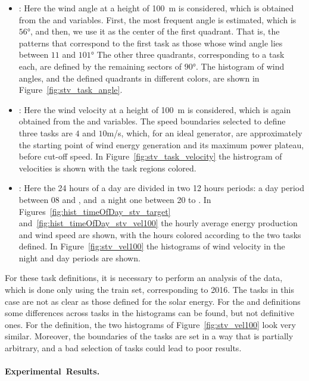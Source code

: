 \begin{itemize}
    \item {}: Here the wind angle at a height of \si{100\metre} is considered, which is obtained from the  and  variables. 
    First, the most frequent angle is estimated, which is $\ang{56}$, and then, we use it as the center of the first quadrant. That is, the patterns that correspond to the first task as those whose wind angle lies between ${11}$ and $\ang{101}$  The other three quadrants, corresponding to a task each, are defined by the remaining sectors of $\ang{90}$.
    The histogram of wind angles, and the defined quadrants in different colors, are shown in Figure~\ref{fig:stv_task_angle}.
    \item {}: Here the wind velocity at a height of \si{100\metre} is considered, which is again obtained from the  and  variables. The speed boundaries selected to define three tasks are $4$ and $10$m/s, which, for an ideal generator, are approximately the starting point of wind energy generation and its maximum power plateau, before cut-off speed.   
    In Figure~\ref{fig:stv_task_velocity} the histrogram of velocities is shown with the task regions colored. 
    \item {}: Here the 24 hours of a day are divided in two 12 hours periods: a day period between 08 and , and~a night one between 20 to .
    In Figures~\ref{fig:hist_timeOfDay_stv_target} and~\ref{fig:hist_timeOfDay_stv_vel100} the hourly average energy production and wind speed are shown, with the hours colored according to the two tasks defined. In Figure~\ref{fig:stv_vel100} the histograms of wind velocity in the night and day periods are shown.
\end{itemize}
%
For these task definitions, it is necessary to perform an analysis of the data, which is done only using the train set, corresponding to 2016.
The tasks in this case are not as clear as those defined for the solar energy. For the  and  definitions some differences across tasks in the histograms can be found, but not definitive ones.
For the  definition, the two histograms of Figure~\ref{fig:stv_vel100} look very similar.
Moreover, the boundaries of the tasks are set in a way that is partially arbitrary, and a bad selection of tasks could lead to poor results.


\paragraph*{Experimental~Results.\\}



